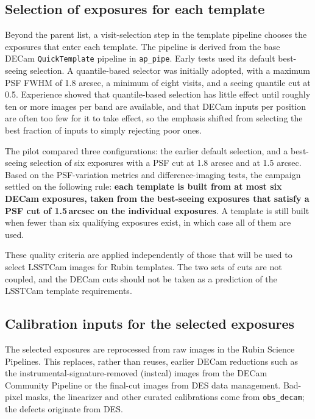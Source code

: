 \subsection{Selection of exposures for each template}

Beyond the parent list, a visit-selection step in the template pipeline chooses the exposures that enter each template. The pipeline is derived from the base DECam \texttt{QuickTemplate} pipeline in \texttt{ap\_pipe}. Early tests used its default best-seeing selection. A quantile-based selector was initially adopted, with a maximum PSF FWHM of 1.8 arcsec, a minimum of eight visits, and a seeing quantile cut at 0.5. Experience showed that quantile-based selection has little effect until roughly ten or more images per band are available, and that DECam inputs per position are often too few for it to take effect, so the emphasis shifted from selecting the best fraction of inputs to simply rejecting poor ones.

The pilot compared three configurations: the earlier default selection, and a best-seeing selection of six exposures with a PSF cut at 1.8 arcsec and at 1.5 arcsec. Based on the PSF-variation metrics and difference-imaging tests, the campaign settled on the following rule: \textbf{each template is built from at most six DECam exposures, taken from the best-seeing exposures that satisfy a PSF cut of 1.5\,arcsec on the individual exposures}. A template is still built when fewer than six qualifying exposures exist, in which case all of them are used.


These quality criteria are applied independently of those that will be used to select LSSTCam images for Rubin templates. The two sets of cuts are not coupled, and the DECam cuts should not be taken as a prediction of the LSSTCam template requirements.

\subsection{Calibration inputs for the selected exposures}

The selected exposures are reprocessed from raw images in the Rubin Science Pipelines. This replaces, rather than reuses, earlier DECam reductions such as the instrumental-signature-removed (instcal) images from the DECam Community Pipeline or the final-cut images from DES data management. Bad-pixel masks, the linearizer and other curated calibrations come from \texttt{obs\_decam}; the defects originate from DES.

